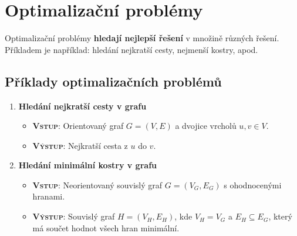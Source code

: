 \section{Optimalizační problémy}
Optimalizační problémy \textbf{hledají nejlepší řešení} v množině různých řešení. Příkladem je například: hledání nejkratší cesty, nejmenší kostry, apod.

\subsection{Příklady optimalizačních problémů}
\begin{enumerate}
    \item \textbf{Hledání nejkratší cesty v grafu}
          \begin{itemize}
              \item \textbf{\textsc{Vstup}}: Orientovaný graf $G = (V, E)$ a dvojice vrcholů $u, v \in V$.
              \item \textbf{\textsc{Výstup}}: Nejkratší cesta z $u$ do $v$.
          \end{itemize}
    \item \textbf{Hledání minimální kostry v grafu}
          \begin{itemize}
              \item \textbf{\textsc{Vstup}}: Neorientovaný souvislý graf $G = (V_G,E_G)$ s ohodnocenými hranami.
              \item \textbf{\textsc{Výstup}}: Souvislý graf $H = (V_H,E_H)$, kde $V_H = V_G$ a $E_H \subseteq E_G$, který má součet hodnot všech hran minimální.
          \end{itemize}
\end{enumerate}